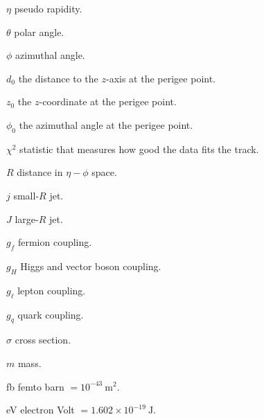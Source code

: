 \begin{symbollist}[0.7in]
    \item[$\eta$] pseudo rapidity.
    \item[$\theta$] polar angle.
    \item[$\phi$] azimuthal angle.
    \item[$d_0$] the distance to the $z$-axis at the perigee point.
    \item[$z_0$] the $z$-coordinate at the perigee point.
    \item[$\phi_0$] the azimuthal angle at the perigee point.
    \item[$\chi^2$] statistic that measures how good the data fits the track.
    \item[$R$] distance in $\eta-\phi$ space.
    \item[$j$] small-$R$ jet.
    \item[$J$] large-$R$ jet.
    \item[$g_f$] fermion coupling.
    \item[$g_H$] Higgs and vector boson coupling.
    \item[$g_\ell$] lepton coupling.
    \item[$g_q$] quark coupling.
    \item[$\sigma$] cross section.
    \item[$m$] mass.
    \item[fb] femto barn $= 10^{-43}~\mathrm{m}^2$.
    \item[eV] electron Volt $= 1.602 \times 10^{-19}~\mathrm{J}$.
\end{symbollist}
